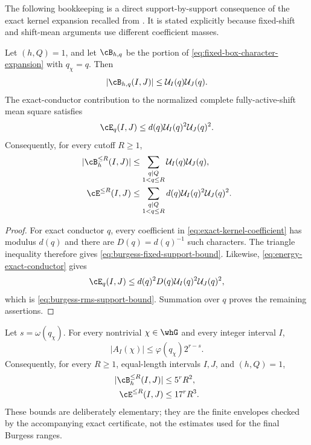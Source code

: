 The following bookkeeping is a direct support-by-support consequence of the
exact kernel expansion recalled from \citet{WangCenteredKernels2026}.  It is
stated explicitly because fixed-shift and shift-mean arguments use different
coefficient masses.

\begin{proposition}
\label{prop:burgess-support-by-support}
Let $(h,Q)=1$, and let $\cB_{h,q}$ be the portion of
\eqref{eq:fixed-box-character-expansion} with $q_\chi=q$.  Then
\begin{equation}\label{eq:burgess-fixed-support-bound}
 |\cB_{h,q}(I,J)|
 \le \mathcal U_I(q)\mathcal U_J(q).
\end{equation}
The exact-conductor contribution to the normalized complete fully-active-shift
mean square satisfies
\begin{equation}\label{eq:burgess-rms-support-bound}
 \cE_q(I,J)
 \le d(q)\mathcal U_I(q)^2\mathcal U_J(q)^2.
\end{equation}
Consequently, for every cutoff $R\ge1$,
\begin{align}
 |\cB_h^{\le R}(I,J)|
 &\le\sum_{\substack{q\mid Q\\1<q\le R}}
       \mathcal U_I(q)\mathcal U_J(q),
 \label{eq:burgess-fixed-low-support-sum}\\
 \cE^{\le R}(I,J)
 &\le\sum_{\substack{q\mid Q\\1<q\le R}}
       d(q)\mathcal U_I(q)^2\mathcal U_J(q)^2.
 \label{eq:burgess-rms-low-support-sum}
\end{align}
\end{proposition}

\begin{proof}
For exact conductor $q$, every coefficient in
\eqref{eq:exact-kernel-coefficient} has modulus $d(q)$ and there are
$D(q)=d(q)^{-1}$ such characters.  The triangle inequality therefore gives
\eqref{eq:burgess-fixed-support-bound}.  Likewise,
\eqref{eq:energy-exact-conductor} gives
\[
 \cE_q(I,J)
 \le d(q)^2D(q)\mathcal U_I(q)^2\mathcal U_J(q)^2,
\]
which is \eqref{eq:burgess-rms-support-bound}.  Summation over $q$ proves the
remaining assertions.
\end{proof}

\begin{corollary}
\label{cor:burgess-elementary-low-envelopes}
Let $s=\omega(q_\chi)$.  For every nontrivial $\chi\in\whG$ and every
integer interval $I$,
\begin{equation}\label{eq:burgess-elementary-phi-bound}
 |A_I(\chi)|
 \le \varphi(q_\chi)2^{r-s}.
\end{equation}
Consequently, for every $R\ge1$, equal-length intervals $I,J$, and
$(h,Q)=1$,
\begin{align}
 |\cB_h^{\le R}(I,J)|&\le5^rR^2,
 \label{eq:burgess-elementary-fixed-low-envelope}\\
 \cE^{\le R}(I,J)&\le17^rR^3.
 \label{eq:burgess-elementary-energy-low-envelope}
\end{align}
These bounds are deliberately elementary; they are the finite envelopes
checked by the accompanying exact certificate, not the estimates used for
the final Burgess ranges.
\end{corollary}

